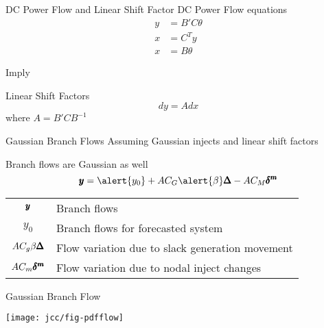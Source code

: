 \begin{frame}{DC Power Flow and Linear Shift Factor}
DC Power Flow equations
\begin{align*}
y&=B' C \theta \\
x &= C^T y\\
x &= B \theta
\end{align*}

\pause
Imply

Linear Shift Factors
\begin{equation*}
 d y = A d x 
\end{equation*}
where $A = B' C B^{-1}$

\end{frame}

\begin{frame}{Gaussian Branch Flows}
Assuming Gaussian injects and linear shift factors
\bi
\item Branch flows are Gaussian as well
\ei
\pause
\begin{equation*}
 \ry = \alert{y_0}+ A C_G\alert{ \beta }\rD  - A C_M \rdm 
\end{equation*}
\pause
\begin{tabular}{c l}
$\pmb{y}$ & Branch flows \\
$y_0$ & Branch flows for forecasted system \\
$A C_g \beta \pmb{\Delta}$ &  Flow variation due to slack generation movement \\
$A C_m \pmb{\delta^m} $ & Flow variation due to nodal inject changes
\end{tabular}

\end{frame}


\begin{frame}{Gaussian Branch Flow}
\begin{center}
\texttt{[image: jcc/fig-pdfflow]}
\end{center}
\end{frame}


